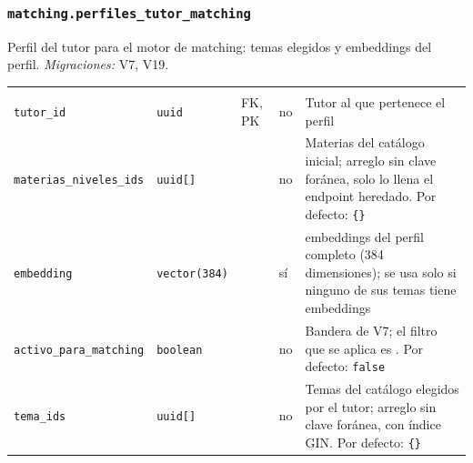 \subsubsection{\texorpdfstring{\texttt{matching.perfiles\_\allowbreak{}tutor\_\allowbreak{}matching}}{matching.perfiles\_tutor\_matching}}\label{dd:matching.perfiles_tutor_matching}

Perfil del tutor para el motor de \gls{matching}: temas elegidos y \gls{embeddings} del perfil. \emph{Migraciones:} V7, V19.

{\small
\begin{xltabular}{\textwidth}{@{}>{\raggedright\arraybackslash}p{3.6cm} >{\raggedright\arraybackslash}p{2.3cm} >{\raggedright\arraybackslash}p{1cm} >{\centering\arraybackslash}p{0.85cm} L@{}}
    \toprule
     &  &  &  &  \\
    \midrule
    \endfirsthead
    \toprule
     &  &  &  &  \\
    \midrule
    \endhead
    \bottomrule
    \endfoot
    \texttt{tutor\_\allowbreak{}id} & \texttt{uuid} & FK, PK & no & Tutor al que pertenece el perfil \\
    \texttt{materias\_\allowbreak{}niveles\_\allowbreak{}ids} & \texttt{uuid[]} &  & no & Materias del catálogo inicial; arreglo sin clave foránea, solo lo llena el endpoint heredado. Por defecto: \texttt{\textquotesingle{}\{\}\textquotesingle{}} \\
    \texttt{embedding} & \texttt{vector(\allowbreak{}384)} &  & sí & \gls{embeddings} del perfil completo (384 dimensiones); se usa solo si ninguno de sus temas tiene \gls{embeddings} \\
    \texttt{activo\_\allowbreak{}para\_\allowbreak{}matching} & \texttt{boolean} &  & no & Bandera de V7; el filtro que se aplica es . Por defecto: \texttt{false} \\
    \texttt{tema\_\allowbreak{}ids} & \texttt{uuid[]} &  & no & Temas del catálogo elegidos por el tutor; arreglo sin clave foránea, con índice GIN. Por defecto: \texttt{\textquotesingle{}\{\}\textquotesingle{}} \\
\end{xltabular}
}

